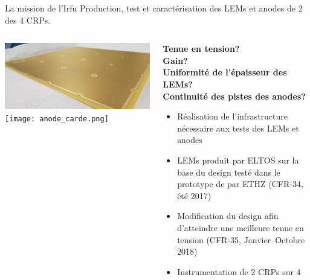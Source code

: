     \begin{frame}{La mission de l'Irfu}
        \centering Production, test et caractérisation des LEMs et anodes de 2 des 4 CRPs.\\\vfill
    	\begin{scriptsize}
        	\begin{columns}
            	\begin{column}{0.5\textwidth}
                	\includegraphics[width=\textwidth]{./pictures/LEM.png}\\
                   	\texttt{[image: anode\_carde.png]}
            	\end{column}
       	        \begin{column}{0.5\textwidth}
           	        \textbf{Tenue en tension?\\
           	        Gain?\\
           	        Uniformité de l'épaisseur des LEMs?\\
           	        Continuité des pistes des anodes?\\}\vspace{0.3cm}
           	        \begin{itemize}
               	        \item Réalisation de l'infrastructure nécessaire aux tests des LEMs et anodes
               	        \item LEMs produit par ELTOS sur la base du design testé dans le prototype de \threeL{} par ETHZ (CFR-34, été 2017)
               	        \item Modification du design afin d'atteindre une meilleure tenue en tension (CFR-35, Janvier--Octobre 2018)
               	        \item Instrumentation de 2 CRPs sur 4
           	        \end{itemize}
       	        \end{column}
        	\end{columns}
   		\end{scriptsize}
    \end{frame}
    

